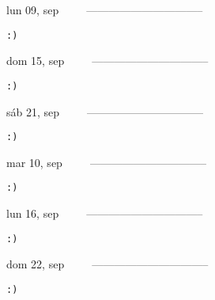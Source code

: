 \documentclass[letterpaper,10pt]{article}
\begin{document}
\begin{multicols}{3}
{lun 09, sep\ \ \ \ \ --------------------------------}
\begin{flushright}\begin{small}\texttt{:)}\end{small}\end{flushright}
\vfill
{dom 15, sep\ \ \ \ \ --------------------------------}
\begin{flushright}\begin{small}\texttt{:)}\end{small}\end{flushright}\par
\vfill
{sáb 21, sep\ \ \ \ \ --------------------------------}
\begin{flushright}\begin{small}\texttt{:)}\end{small}\end{flushright}\par
\vfill
\end{multicols}
\vspace{1.05cm}

\begin{multicols}{3}
{mar 10, sep\ \ \ \ \ --------------------------------}
\begin{flushright}\begin{small}\texttt{:)}\end{small}\end{flushright}
\vfill
{lun 16, sep\ \ \ \ \ --------------------------------}
\begin{flushright}\begin{small}\texttt{:)}\end{small}\end{flushright}\par
\vfill
{dom 22, sep\ \ \ \ \ --------------------------------}
\begin{flushright}\begin{small}\texttt{:)}\end{small}\end{flushright}\par
\vfill
\end{multicols}
\vspace{1.05cm}
\end{document}
